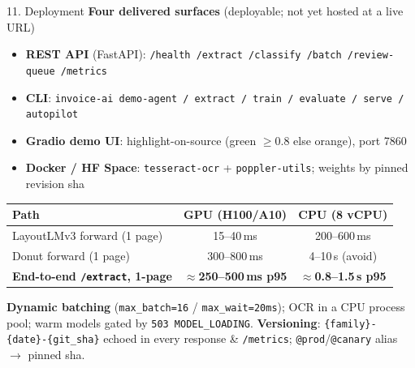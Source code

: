 \documentclass[10pt,aspectratio=169]{beamer}
\begin{document}
\begin{frame}{11. Deployment}
\textbf{Four delivered surfaces} (deployable; not yet hosted at a live URL)
\begin{itemize}\small
  \item \textbf{REST API} (FastAPI): \texttt{/health /extract /classify /batch /review-queue /metrics}
  \item \textbf{CLI}: \texttt{invoice-ai demo-agent / extract / train / evaluate / serve / autopilot}
  \item \textbf{Gradio demo UI}: highlight-on-source (green $\geq$0.8 else orange), port 7860
  \item \textbf{Docker / HF Space}: \texttt{tesseract-ocr} + \texttt{poppler-utils}; weights by pinned revision sha
\end{itemize}

\begin{table}[h]
\centering\scriptsize
\begin{tabular}{lcc}
\toprule
\textbf{Path} & \textbf{GPU (H100/A10)} & \textbf{CPU (8 vCPU)} \\
\midrule
LayoutLMv3 forward (1 page)   & 15--40\,ms & 200--600\,ms \\
Donut forward (1 page)        & 300--800\,ms & 4--10\,s (avoid) \\
\textbf{End-to-end \texttt{/extract}, 1-page} & \textbf{$\approx$250--500\,ms p95} & \textbf{$\approx$0.8--1.5\,s p95} \\
\bottomrule
\end{tabular}
\end{table}

\scriptsize \textbf{Dynamic batching} (\texttt{max\_batch=16} / \texttt{max\_wait=20ms}); OCR in a CPU process pool; warm models gated by \texttt{503 MODEL\_LOADING}. \textbf{Versioning}: \texttt{\{family\}-\{date\}-\{git\_sha\}} echoed in every response \& \texttt{/metrics}; \texttt{@prod}/\texttt{@canary} alias $\to$ pinned sha.
\end{frame}
\end{document}
